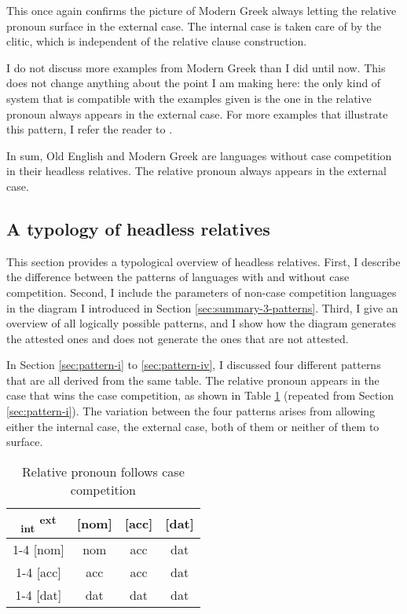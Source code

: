 This once again confirms the picture of Modern Greek always letting the relative pronoun surface in the external case. The internal case is taken care of by the clitic, which is independent of the relative clause construction.

I do not discuss more examples from Modern Greek than I did until now. This does not change anything about the point I am making here: the only kind of system that is compatible with the examples given is the one in the relative pronoun always appears in the external case. For more examples that illustrate this pattern, I refer the reader to .

In sum, Old English and Modern Greek are languages without case competition in their headless relatives. The relative pronoun always appears in the external case.

\subsection{A typology of headless relatives}\label{sec:typology}

This section provides a typological overview of headless relatives. First, I describe the difference between the patterns of languages with and without case competition. Second, I include the parameters of non-case competition languages in the diagram I introduced in Section \ref{sec:summary-3-patterns}. Third, I give an overview of all logically possible patterns, and I show how the diagram generates the attested ones and does not generate the ones that are not attested.

In Section \ref{sec:pattern-i} to \ref{sec:pattern-iv}, I discussed four different patterns that are all derived from the same table. The relative pronoun appears in the case that wins the case competition, as shown in Table \ref{tbl:case-competition-int-ext-typology} (repeated from Section \ref{sec:pattern-i}). The variation between the four patterns arises from allowing either the internal case, the external case, both of them or neither of them to surface.

\begin{table}[H]
  \center
  \caption{Relative pronoun follows case competition}
  \begin{tabular}{c|c|c|c}
    \toprule
    \textsubscript{\ac{int}} \textsuperscript{\ac{ext}}
           & [\ac{nom}]
           & [\ac{acc}]
           & [\ac{dat}]
           \\ \cmidrule{1-4}
       [\ac{nom}]
           & \ac{nom}
           & \ac{acc}
           & \ac{dat}
           \\ \cmidrule{1-4}
       [\ac{acc}]
           & \ac{acc}
           & \ac{acc}
           & \ac{dat}
           \\ \cmidrule{1-4}
       [\ac{dat}]
           & \ac{dat}
           & \ac{dat}
           & \ac{dat}
           \\
     \bottomrule
  \end{tabular}
    \label{tbl:case-competition-int-ext-typology}
\end{table}

